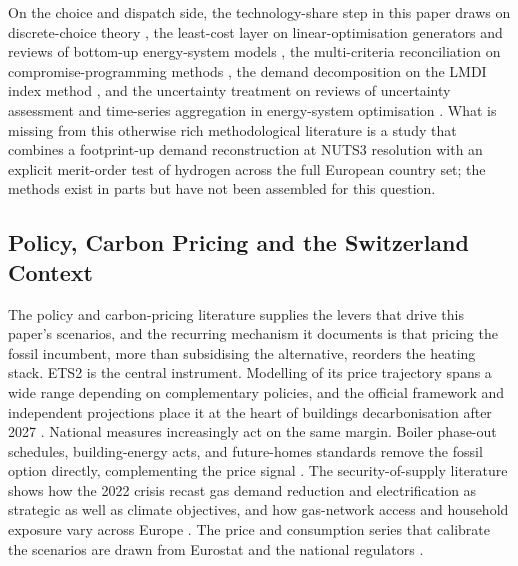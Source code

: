 On the choice and dispatch side, the technology-share step in this paper draws on
discrete-choice theory \citep{McFadden1974ConditionalLogit, Train2009DiscreteChoice},
the least-cost layer on linear-optimisation generators and reviews of bottom-up
energy-system models \citep{Krien2020Oemofsolpha,Juan2021Review}, the multi-criteria
reconciliation on compromise-programming methods \citep{Yu1973GroupDecision,
Zeleny1973CompromiseProgramming}, the demand decomposition on the LMDI index method
\citep{Ang2005}, and the uncertainty treatment on reviews of uncertainty assessment and
time-series aggregation in energy-system optimisation \citep{Yue2018Uncertainty,
Hoffmann2020Review}. What is missing from this otherwise rich methodological literature
is a study that combines a footprint-up demand reconstruction at NUTS3 resolution with
an explicit merit-order test of hydrogen across the full European country set; the
methods exist in parts but have not been assembled for this question.

\subsection{Policy, Carbon Pricing and the Switzerland Context}
\label{sec:lit:switzerland}

The policy and carbon-pricing literature supplies the levers that drive this
paper's scenarios, and the recurring mechanism it documents is that pricing the
fossil incumbent, more than subsidising the alternative, reorders the heating
stack. ETS2 is the central instrument. Modelling of its price trajectory spans a
wide range depending on complementary policies, and the official framework and
independent projections place it at the heart of buildings decarbonisation after
2027 \citep{EuropeanCommission2024ETS2,Gunther2025ets2}. National measures increasingly act on the same margin. Boiler
phase-out schedules, building-energy acts, and future-homes standards remove the
fossil option directly, complementing the price signal
\citep{EHPA2025boilerbans,GER2024GEG}.
The security-of-supply literature shows how the 2022 crisis recast gas demand
reduction and electrification as strategic as well as climate objectives, and how
gas-network access and household exposure vary across Europe
\citep{Goldthau2023Eu,Helwig2023Eu}. The price and consumption series that
calibrate the scenarios are drawn from Eurostat and the national regulators
\citep{EurostatNRG2025,Eurostat2025prices}.

